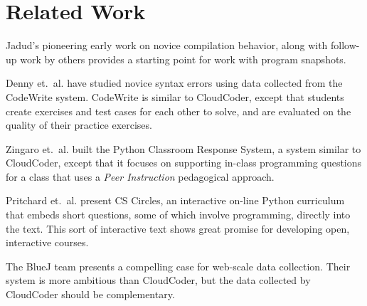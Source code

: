\documentclass{sig-alternate}
\begin{document}
\section{Related Work}

Jadud's pioneering early work on novice compilation
behavior\cite{Jadud:2006:MTE:1151588.1151600}, along with follow-up work by
others\cite{Norris:2008:CCQ:1384271.1384284} provides a starting point for
work with program snapshots.

Denny et.\ al. have studied novice syntax errors\cite{Denny:2012:SEE:2325296.2325318}
using data collected from the CodeWrite system.
CodeWrite is similar to CloudCoder, except that students create
exercises and test cases for each other to solve, and are evaluated on
the quality of their practice exercises.


Zingaro et.\ al. built the Python Classroom Response
System\cite{Zingaro:2013:FCP:2445196.2445369}, a system similar to
CloudCoder, except that it focuses on supporting in-class programming
questions for a class that uses a {\em Peer Instruction} pedagogical approach.

Pritchard et.\ al. present CS Circles\cite{Pritchard:2013:CCI:2445196.2445370},
an interactive on-line
Python curriculum that embeds short questions, some of which involve
programming, directly into the text.  This sort of interactive text
shows great promise for developing open, interactive courses.

The BlueJ team presents a compelling case for web-scale data
collection\cite{Utting:2012:WDG:2361276.2361278}.  Their system is
more ambitious than CloudCoder, but the data collected by CloudCoder
should be complementary.
\end{document}
